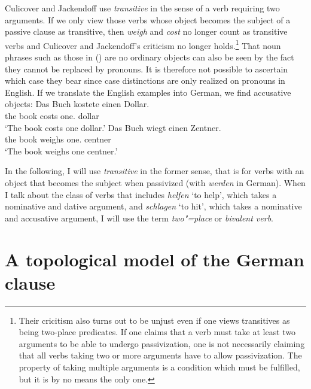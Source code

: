 {Culicover and Jackendoff use \emph{transitive} in the sense of a verb requiring two arguments. If we only view those verbs whose object becomes the subject of
a passive clause as transitive, then \emph{weigh} and \emph{cost} no longer count as transitive verbs and Culicover and Jackendoff's criticism no longer holds.\footnote{
Their cricitism also turns out to be unjust even if one views transitives as being two-place predicates. If one claims that a verb must take at least two arguments to be able
to undergo passivization, one is not necessarily claiming that all verbs taking two or more arguments have to allow passivization. The property of taking multiple arguments is
a condition which must be fulfilled, but it is by no means the only one.
}
That noun phrases such as those in () are no ordinary objects can also be seen by the fact they cannot be replaced by pronouns. It is therefore not possible to ascertain
which case they bear since case distinctions are only realized on pronouns in English.
If we translate the English examples into German, we find accusative objects:
\eal
\ex 
\gll Das Buch kostete einen Dollar.\\
      the book costs one.\acc{} dollar\\
\glt `The book costs one dollar.'
\ex 
\gll Das Buch wiegt einen Zentner.\\
     the book weighs one.\acc{} centner\\
\glt `The book weighs one centner.'
\zl



In the following, I will use \emph{transitive} in the former sense, that is for verbs with an object that becomes the subject when passivized (\eg with
\emph{werden} in German). When I talk about the class of verbs that includes \emph{helfen} `to help', which takes a nominative and dative argument, and \emph{schlagen} `to hit', 
which takes a nominative and accusative argument, I will use the term \emph{two"=place} or \emph{bivalent verb}.

\section{A topological model of the German clause}
\label{sec-topo}
\label{Abschnitt-Toplogie}

}
